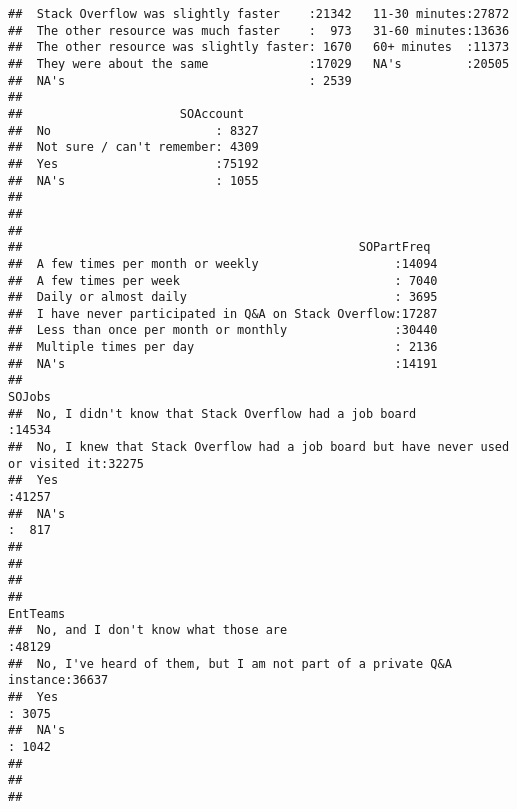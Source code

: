 \documentclass[]{article}
\begin{document}
\begin{verbatim}
##  Stack Overflow was slightly faster    :21342   11-30 minutes:27872  
##  The other resource was much faster    :  973   31-60 minutes:13636  
##  The other resource was slightly faster: 1670   60+ minutes  :11373  
##  They were about the same              :17029   NA's         :20505  
##  NA's                                  : 2539                        
##                                                                      
##                      SOAccount    
##  No                       : 8327  
##  Not sure / can't remember: 4309  
##  Yes                      :75192  
##  NA's                     : 1055  
##                                   
##                                   
##                                   
##                                               SOPartFreq   
##  A few times per month or weekly                   :14094  
##  A few times per week                              : 7040  
##  Daily or almost daily                             : 3695  
##  I have never participated in Q&A on Stack Overflow:17287  
##  Less than once per month or monthly               :30440  
##  Multiple times per day                            : 2136  
##  NA's                                              :14191  
##                                                                               SOJobs     
##  No, I didn't know that Stack Overflow had a job board                           :14534  
##  No, I knew that Stack Overflow had a job board but have never used or visited it:32275  
##  Yes                                                                             :41257  
##  NA's                                                                            :  817  
##                                                                                          
##                                                                                          
##                                                                                          
##                                                                 EntTeams    
##  No, and I don't know what those are                                :48129  
##  No, I've heard of them, but I am not part of a private Q&A instance:36637  
##  Yes                                                                : 3075  
##  NA's                                                               : 1042  
##                                                                             
##                                                                             
##                                                                             

\end{verbatim}
\end{document}
